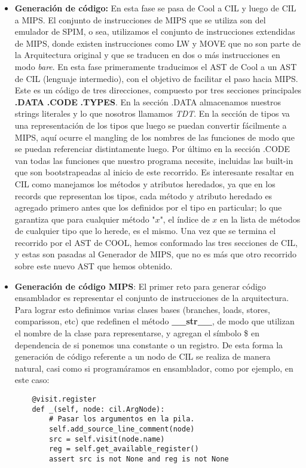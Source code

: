 \documentclass[a4paper, 12pt]{article}
\begin{document}
\begin{itemize}
\begin{itemize}
\end{itemize}
\item \textbf{Generación de código:} En esta fase se pasa de Cool a CIL y luego de CIL a MIPS. 
El conjunto de instrucciones de MIPS que se utiliza son del emulador de SPIM, o sea, utilizamos el conjunto
de instrucciones extendidas de MIPS, donde existen instrucciones como LW y MOVE que no son parte de la Arquitectura
original y que se traducen en dos o m\'as instrucciones en modo \textit{bare}. En esta fase primeramente traducimos
el AST de Cool a un AST de CIL (lenguaje intermedio), con el objetivo de facilitar el paso hacia MIPS. Este es un c\'odigo
de tres direcciones, compuesto por tres secciones principales \textbf{.DATA} \textbf{.CODE} \textbf{.TYPES}.
En la secci\'on .DATA almacenamos nuestros strings literales y lo que nosotros llamamos \textit{TDT}. En la secci\'on
de tipos va una representaci\'on de los tipos que luego se puedan convertir f\'acilmente a MIPS, aqu\'i ocurre el mangling
de los nombres de las funciones de modo que se puedan referenciar distintamente luego. Por \'ultimo en la secci\'on
.CODE van todas las funciones que nuestro programa necesite, incluidas las built-in que son bootstrapeadas al
inicio de este recorrido. Es interesante resaltar en CIL como manejamos los m\'etodos y atributos heredados, ya
que en los records que representan los tipos, cada m\'etodo y atributo heredado es agregado primero antes que los definidos
por el tipo en particular; lo que garantiza que para cualquier m\'etodo "$x$", el \'indice de $x$ en la lista de m\'etodos
de cualquier tipo que lo herede, es el mismo. Una vez que se termina el recorrido por el AST de COOL, hemos conformado
las tres secciones de CIL, y estas son pasadas al Generador de MIPS, que no es m\'as que otro recorrido sobre este nuevo
AST que hemos obtenido.

\item \textbf{Generaci\'on de c\'odigo MIPS}: El primer reto para generar c\'odigo ensamblador es representar el
conjunto de instrucciones de la arquitectura. Para lograr esto definimos varias clases bases (branches, loads, stores, comparisson, etc)
que redefinen el m\'etodo \textbf{\_\_str\_\_}, de modo que utilizan el nombre de la clase para representarse, y agregan el s\'imbolo
\$ en dependencia de si ponemos una constante o un registro. De esta forma la generaci\'on de c\'odigo referente a un nodo de CIL
se realiza de manera natural, casi como si program\'aramos en ensamblador, como por ejemplo, en este caso:

\begin{verbatim}
	@visit.register
    def _(self, node: cil.ArgNode):
        # Pasar los argumentos en la pila.
        self.add_source_line_comment(node)
        src = self.visit(node.name)
        reg = self.get_available_register()
        assert src is not None and reg is not None


\end{verbatim}
\end{itemize}
\end{document}
